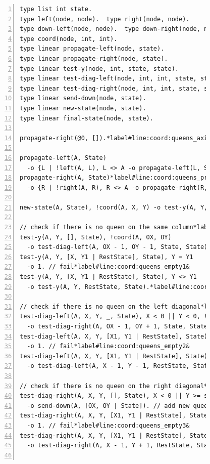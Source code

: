 \begin{figure}[h!]
\begin{Verbatim}[numbers=left,fontsize=\scriptsize,commandchars=\*\#\&]
type list int state.
type left(node, node).  type right(node, node).
type down-left(node, node).  type down-right(node, node).
type coord(node, int, int).
type linear propagate-left(node, state).
type linear propagate-right(node, state).
type linear test-y(node, int, state, state).
type linear test-diag-left(node, int, int, state, state).
type linear test-diag-right(node, int, int, state, state).
type linear send-down(node, state).
type linear new-state(node, state).
type linear final-state(node, state).

propagate-right(@0, []).*label#line:coord:queens_axiom&

propagate-left(A, State)
  -o {L | !left(A, L), L <> A -o propagate-left(L, State)}, new-state(A, State).
propagate-right(A, State)*label#line:coord:queens_propr1&
  -o {R | !right(A, R), R <> A -o propagate-right(R, State)}, new-state(A, State).*label#line:coord:queens_propr2&

new-state(A, State), !coord(A, X, Y) -o test-y(A, Y, State, State).

// check if there is no queen on the same column*label#line:coord:queens_col1&
test-y(A, Y, [], State), !coord(A, OX, OY)
  -o test-diag-left(A, OX - 1, OY - 1, State, State).
test-y(A, Y, [X, Y1 | RestState], State), Y = Y1
  -o 1. // fail*label#line:coord:queens_empty1&
test-y(A, Y, [X, Y1 | RestState], State), Y <> Y1
  -o test-y(A, Y, RestState, State).*label#line:coord:queens_col2&

// check if there is no queen on the left diagonal*label#line:coord:queens_ldiag1&
test-diag-left(A, X, Y, _, State), X < 0 || Y < 0, !coord(A, OX, OY)
  -o test-diag-right(A, OX - 1, OY + 1, State, State).
test-diag-left(A, X, Y, [X1, Y1 | RestState], State), X = X1, Y = Y1
  -o 1. // fail*label#line:coord:queens_empty2&
test-diag-left(A, X, Y, [X1, Y1 | RestState], State), X <> X1 || Y <> Y1
  -o test-diag-left(A, X - 1, Y - 1, RestState, State).*label#line:coord:queens_ldiag2&

// check if there is no queen on the right diagonal*label#line:coord:queens_rdiag1&
test-diag-right(A, X, Y, [], State), X < 0 || Y >= size, !coord(A, OX, OY)
  -o send-down(A, [OX, OY | State]). // add new queen*label#line:coord:queens_add&
test-diag-right(A, X, Y, [X1, Y1 | RestState], State), X = X1, Y = Y1
  -o 1. // fail*label#line:coord:queens_empty3&
test-diag-right(A, X, Y, [X1, Y1 | RestState], State), X <> X1 || Y <> Y1
  -o test-diag-right(A, X - 1, Y + 1, RestState, State).*label#line:coord:queens_rdiag2&


\end{Verbatim}
\end{figure}

